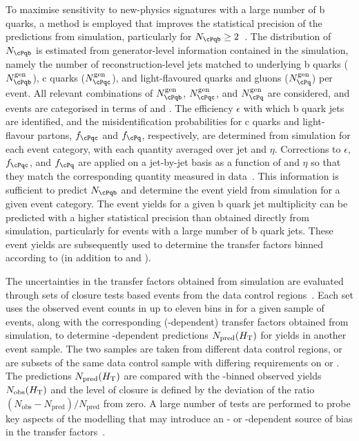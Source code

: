 To maximise sensitivity to new-physics signatures with a large number
of b quarks, a method is employed that improves the statistical
precision of the predictions from simulation, particularly for
$N_\cPqb \ge 2$~\cite{RA1Paper2012}. The distribution of $N_\cPqb$ is
estimated from generator-level information contained in the
simulation, namely the number of reconstruction-level jets matched to
underlying b quarks ($N_\cPqb^\text{gen}$), c quarks
($N_\cPqc^\text{gen}$), and light-flavoured quarks and gluons
($N_\cPq^\text{gen}$) per event. All relevant combinations of
$N_\cPqb^\text{gen}$, $N_\cPqc^\text{gen}$, and $N_{\cPq}^\text{gen}$
are considered, and events are categorised in terms of \njet and
\scalht.  The efficiency $\epsilon$ with which b quark jets are
identified, and the misidentification probabilities for c quarks and
light-flavour partons, $f_\cPqc$ and $f_\cPq$, respectively, are
determined from simulation for each event category, with each quantity
averaged over jet \pt and $\eta$. Corrections to $\epsilon$,
$f_\cPqc$, and $f_\cPq$ are applied on a jet-by-jet basis as a
function of \pt and $\eta$ so that they match the corresponding
quantity measured in data~\cite{Chatrchyan:2012jua}. This information
is sufficient to predict $N_\cPqb$ and determine the event yield from
simulation for a given event category. The event yields for a given b
quark jet multiplicity can be predicted with a higher statistical
precision than obtained directly from simulation, particularly for
events with a large number of b quark jets. These event yields are
subsequently used to determine the transfer factors binned according
to \nb (in addition to \njet and \scalht).

The uncertainties in the transfer factors obtained from simulation are
evaluated through sets of closure tests based events from the data
control regions~\cite{RA1Paper2012}. Each set uses the observed event
counts in up to eleven bins in \scalht for a given sample of events,
along with the corresponding (\scalht-dependent) transfer factors
obtained from simulation, to determine \scalht-dependent predictions
$N_\text{pred}(H_\text{T})$ for yields in another event sample. The two
samples are taken from different data control regions, or are subsets
of the same data control sample with differing requirements on \njet
or \nb. The predictions $N_\text{pred}(H_\text{T})$ are compared with the
\scalht-binned observed yields $N_\text{obs}(H_\text{T})$ and the level
of closure is defined by the deviation of the ratio $(N_\text{obs} -
N_\text{pred})/N_\text{pred}$ from zero. A large number of tests are
performed to probe key aspects of the modelling that may introduce an
\njet- or \scalht-dependent source of bias in the transfer
factors~\cite{RA1Paper2012}.

